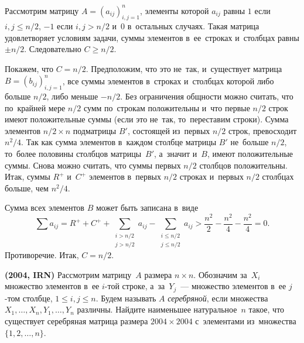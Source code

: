 \ifincludesolutions
Рассмотрим матрицу $A = (a_{ij})_{i,j=1}^n$, элементы которой $a_{ij}$ равны
$1$ если $i, j \leq n / 2$, $-1$ если $i, j > n / 2$ и~0 в~остальных случаях.
Такая матрица удовлетворяет условиям задачи, суммы элементов в~ее~строках
и~столбцах равны $\pm n / 2$.
Следовательно $C \geq n / 2$.

Покажем, что $C = n / 2$.
Предположим, что это не~так, и~существует матрица $B = (b_{ij})_{i,j=1}^n$,
все суммы элементов в~строках и~столбцах которой либо больше $n / 2$, либо
меньше $- n / 2$.
Без ограничения общности можно считать, что по~крайней мере $n / 2$ сумм
по~строкам положительны и~что первые $n / 2$ строк имеют положительные суммы
(если это не~так, то~переставим строки).
Сумма элементов $n / 2 \times n$ подматрицы $B'$, состоящей из~первых $n / 2$
строк, превосходит $n^2 / 4$.
Так как сумма элементов в~каждом столбце матрицы $B'$ не~больше $n / 2$,
то~более половины столбцов матрицы~$B'$, а~значит и~$B$, имеют положительные
суммы.
Снова можно считать, что суммы первых $n/2$ столбцов положительны.
Итак, суммы $R^+$ и~$C^+$ элементов в~первых $n / 2$ строках и~первых $n / 2$
столбцах больше, чем $n^2 / 4$.
\par
Сумма всех элементов $B$ может быть записана в~виде
\[
    \sum a_{ij}
=
    {R^+} + {C^+}
    +
    \sum_{\substack{i > n / 2 \\ j > n / 2}}
        a_{ij}
    -
    \sum_{\substack{i \leq n / 2 \\ j \leq n / 2}}
        a_{ij}
>
    \frac{n^2}{2} - \frac{n^2}{4}  -\frac{n^2}{4}
=
    0
.\]
Противоречие.
Итак, $C = n / 2$.
\fi %

\begin{problems}

\item\textbf{(2004, IRN)}
Рассмотрим матрицу~$A$ размера $n \times n$.
Обозначим за~$X_i$ множество элементов в~ее $i$-той строке, а~за~$Y_j$~---
множество элементов в~ее $j$-том столбце, $1 \leq i, j \leq n$.
Будем называть $A$ \emph{серебряной}, если множества
$X_1, \ldots, X_n, Y_1, \ldots, Y_n$ различны.
Найдите наименьшее натуральное~$n$ такое, что существует серебряная матрица
размера $2004 \times 2004$ с~элементами из~множества $\{ 1, 2, \ldots, n \}$.

\end{problems}

